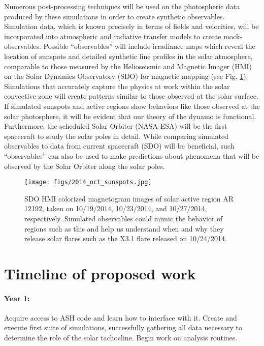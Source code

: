 \documentclass[aasms,12pt]{article}
\begin{document}
Numerous post-processing techniques will be used on the photospheric data 
produced by these simulations in order to create synthetic observables.
Simulation data, which is known precisely in terms of fields and velocities, 
will be incorporated into atmospheric and radiative transfer models to create
mock-observables.  Possible ``observables'' will
include irradiance maps which reveal the location of sunspots and 
detailed synthetic line profiles in the solar atmosphere, 
comparable to those measured by the Helioseismic and
Magnetic Imager (HMI) on the Solar Dynamics Observatory (SDO) for magnetic 
mapping (see Fig. \ref{AR12192}).  Simulations
that accurately capture the physics at work within the solar convective zone
will create patterns similar to those observed at the solar surface.  If
simulated sunspots and active regions show behaviors like those observed at the
solar photosphere, it will be evident that our
theory of the dynamo is functional.  
Furthermore, the scheduled Solar Orbiter (NASA-ESA)
will be the first spacecraft to study the solar poles in detail.  
While comparing simulated observables to data from current spacecraft (SDO) will be
beneficial, such ``observables'' can also be used to make predictions about 
phenomena that will be
observed by the Solar Orbiter along the solar poles. 

\begin{figure}[t!]
\centering
\texttt{[image: figs/2014\_oct\_sunspots.jpg]}
\caption{SDO HMI colorized magnetogram images of solar active region AR 12192, taken
	on 10/19/2014, 10/23/2014, and 10/27/2014, respectively.  Simulated
	observables could mimic the behavior of regions such as this and help
	us understand when and why they release solar flares such as the X3.1
	flare released on 10/24/2014.
	\label{AR12192}}
\end{figure}

\section{Timeline of proposed work}
\paragraph{Year 1:}
Acquire access to ASH code and learn how to interface with it.
Create and execute first suite of simulations, successfully gathering
all data necessary to determine the role of the solar tachocline.  
Begin work on analysis routines.  
\vspace{-0.5cm}
\end{document}

